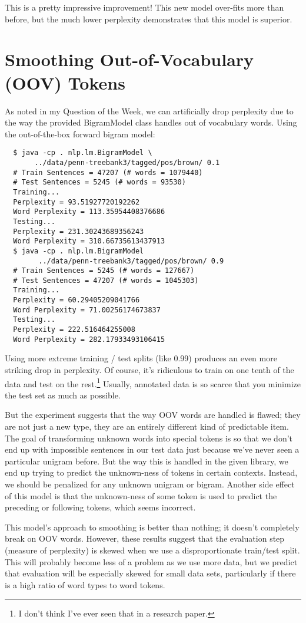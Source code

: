 \documentclass[10pt]{article}
\begin{document}
\noindent This is a pretty impressive improvement! This new model over-fits more than before, but the much lower perplexity demonstrates that this model is superior.

\section{Smoothing Out-of-Vocabulary (OOV) Tokens}

As noted in my Question of the Week, we can artificially drop perplexity due to the way the provided BigramModel class handles out of vocabulary words. Using the out-of-the-box forward bigram model:
\begin{lstlisting}
  $ java -cp . nlp.lm.BigramModel \
       ../data/penn-treebank3/tagged/pos/brown/ 0.1
  # Train Sentences = 47207 (# words = 1079440)
  # Test Sentences = 5245 (# words = 93530)
  Training...
  Perplexity = 93.51927720192262
  Word Perplexity = 113.35954408376686
  Testing...
  Perplexity = 231.30243689356243
  Word Perplexity = 310.66735613437913
  $ java -cp . nlp.lm.BigramModel
        ../data/penn-treebank3/tagged/pos/brown/ 0.9
  # Train Sentences = 5245 (# words = 127667)
  # Test Sentences = 47207 (# words = 1045303)
  Training...
  Perplexity = 60.29405209041766
  Word Perplexity = 71.00256174673837
  Testing...
  Perplexity = 222.516464255008
  Word Perplexity = 282.17933493106415
\end{lstlisting}
%
Using more extreme training / test splits (like 0.99) produces an even more striking drop in perplexity.
Of course, it's ridiculous to train on one tenth of the data and test on the rest.\footnote{I don't think I've ever seen that in a research paper.} Usually, annotated data is so scarce that you minimize the test set as much as possible.

But the experiment suggests that the way OOV words are handled is flawed; they are not just a new type, they are an entirely different kind of predictable item. The goal of transforming unknown words into special tokens is so that we don't end up with impossible sentences in our test data just because we've never seen a particular unigram before. But the way this is handled in the given library, we end up trying to predict the unknown-ness of tokens in certain contexts. Instead, we should be penalized for any unknown unigram or bigram. Another side effect of this model is that the unknown-ness of some token is used to predict the preceding or following tokens, which seems incorrect.

This model's approach to smoothing is better than nothing; it doesn't completely break on OOV words. However, these results suggest that the evaluation step (measure of perplexity) is skewed when we use a disproportionate train/test split. This will probably become less of a problem as we use more data, but we predict that evaluation will be especially skewed for small data sets, particularly if there is a high ratio of word types to word tokens.
\end{document}
